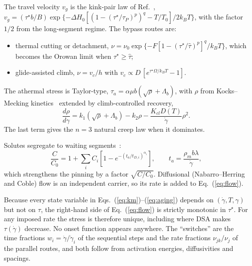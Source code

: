 \documentclass[aps,prl,twocolumn,superscriptaddress,amsmath,amssymb,floatfix]{revtex4-2}
\newcommand{\gd}{\dot\gamma}
\newcommand{\ts}{\tau^{\star}}
\newcommand{\kT}{k_BT}
\begin{document}
The travel velocity $v_g$ is the kink-pair law of Ref.~\cite{Po2016},
$v_g=(\ts b/B)\exp\{-\Delta H_0[(1-(\ts/\tau_P)^p)^q-T/T_0]/2\kT\}$,
with the factor $1/2$ from the long-segment regime. The bypass routes are:
\begin{itemize}
  \item thermal cutting or detachment, $\nu=\nu_0\exp\{-F[1-(\ts/\hat\tau)^p]^q/\kT\}$, which becomes the Orowan limit when $\ts\geq\hat\tau$;
  \item glide-assisted climb, $\nu=v_c/h$ with $v_c\propto D\,[e^{\ts\Omega/\kT}-1]$.
\end{itemize}
The athermal stress is Taylor-type, $\tau_a=\alpha\mu b(\sqrt{\rho}+\Lambda_b)$, with $\rho$ from Kocks--Mecking kinetics~\cite{MeckingKocks} extended by climb-controlled recovery,
\begin{equation}
\frac{d\rho}{d\gamma}=k_1(\sqrt\rho+\Lambda_b)-k_2\rho-\frac{K_{cl}D(T)}{\gd}\rho^2.
\label{eq:km}
\end{equation}
The last term gives the $n=3$ natural creep law when it dominates.

Solutes segregate to waiting segments~\cite{CottrellBilby,Louat1981,Cheng2001}:
\begin{equation}
\frac{C}{C_0}=1+\sum_iC_i\left[1-e^{-(t_a/t_{D,i})^{\alpha_i}}\right],\qquad t_a=\frac{\rho_m b\lambda}{\gd},
\label{eq:aging}
\end{equation}
which strengthens the pinning by a factor $\sqrt{C/C_0}$. Diffusional (Nabarro--Herring and Coble) flow is an independent carrier, so its rate is added to Eq.~(\ref{eq:flow}).

Because every state variable in Eqs.~(\ref{eq:km})--(\ref{eq:aging}) depends on $(\gd,T,\gamma)$ but not on $\tau$, the right-hand side of Eq.~(\ref{eq:flow}) is strictly monotonic in $\ts$. For any imposed rate the stress is therefore unique, including where DSA makes $\tau(\gd)$ decrease. No onset function appears anywhere. The ``switches'' are the time fractions $w_i=\gd/\gd_i$ of the sequential steps and the rate fractions $\nu_{jk}/\nu_j$ of the parallel routes, and both follow from activation energies, diffusivities and spacings.
\end{document}

